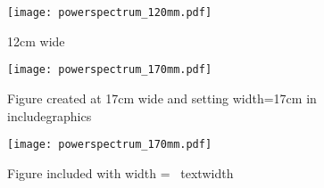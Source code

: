 \documentclass[traditabstract]{aa}
\begin{document}
\begin{figure*}[h]
\centering
\texttt{[image: powerspectrum\_120mm.pdf]}
\caption{\label{fig:gainCurve} 12cm wide} 
\end{figure*}

\begin{figure*}[t]
\centering
\texttt{[image: powerspectrum\_170mm.pdf]}
\caption{\label{fig:gainCurve} Figure created at 17cm wide and setting  width=17cm in includegraphics}
\end{figure*}

\begin{figure*}[t]
\centering
\texttt{[image: powerspectrum\_170mm.pdf]}
\caption{\label{fig:gainCurve} Figure included with width = \ textwidth}
\end{figure*}
\end{document}
